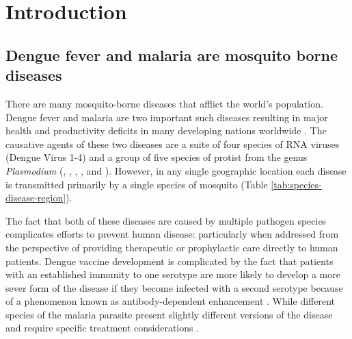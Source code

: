 

\chapter{Introduction}
% 





\section{Dengue fever and malaria are mosquito borne diseases}

There are many mosquito-borne diseases that afflict the world's population.
Dengue fever and malaria are two important such diseases resulting in major health and productivity deficits in many developing nations worldwide \cite{Gubler2012,Sachs2002}.
The causative agents of these two diseases are a suite of four species of RNA viruses (Dengue Virus 1-4) and a group of five species of protist from the genus \textit{Plasmodium} (\Plf, \Pv, \Po, \Pm, and \Pk).
However, in any single geographic location each disease is transmitted primarily by a single species of mosquito (Table \ref{tab:species-disease-region}). 



The fact that both of these diseases are caused by multiple pathogen species complicates efforts to prevent human disease: particularly when addressed from the perspective of providing therapeutic or prophylactic care directly to human patients.
Dengue vaccine development is complicated by the fact that patients with an established immunity to one serotype are more likely to develop a more sever form of the disease if they become infected with a second serotype because of a phenomenon known as antibody-dependent enhancement \cite{Flipse2013}.
While different species of the malaria parasite present slightly different versions of the disease and require specific treatment considerations \cite{Prevention}.  

